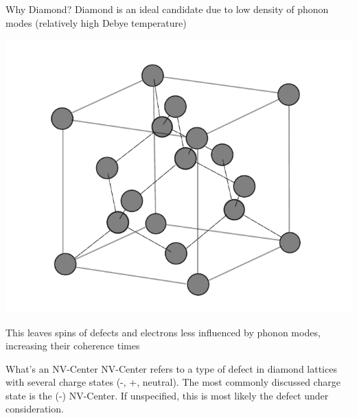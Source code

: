 \documentclass[11pt]{beamer}
\begin{document}
\begin{frame}{Why Diamond?}
Diamond is an ideal candidate due to low density of phonon modes (relatively high Debye temperature)

\begin{center}

\includegraphics[scale=0.47]{diamond_uc.pdf}

\end{center}\pause

This leaves spins of defects and electrons less influenced by phonon modes, increasing their coherence times
\end{frame}

\begin{frame}{What's an NV-Center}
NV-Center refers to a type of defect in diamond lattices with several charge states (-, +, neutral). \pause The most commonly discussed charge state is the (-) NV-Center. If unspecified, this is most likely the defect under consideration.


\vspace{5cm}

\end{frame}
\end{document}
